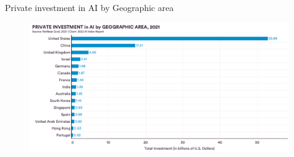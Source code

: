 {

\begin{frame}{
Private investment in AI by Geographic area
}

\begin{figure}
 \centering
 \includegraphics[width=1.0\textwidth]{./figures/progress-of-air-c/outputs/drawing-v01.png}
\end{figure}

\end{frame}
}



%
%
%
%
%

%
%
%
%

